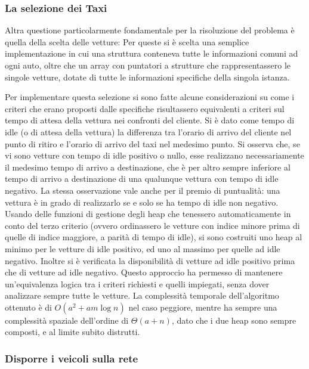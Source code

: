 \documentclass[a4paper,11pt]{Article}
\begin{document}
\subsubsection{La selezione dei Taxi}

Altra questione particolarmente fondamentale per la risoluzione del problema è quella della scelta delle vetture: Per queste si è scelta una semplice implementazione in cui una struttura conteneva tutte le informazioni comuni ad ogni auto, oltre che un array con puntatori a strutture che rappresentassero le singole vetture, dotate di tutte le informazioni specifiche della singola istanza.

Per implementare questa selezione si sono fatte alcune considerazioni su come i criteri che erano proposti dalle specifiche risultassero equivalenti a criteri sul tempo di attesa della vettura nei confronti del cliente.
Si è dato come tempo di idle (o di attesa della vettura) la differenza tra l'orario di arrivo del cliente nel punto di ritiro e l'orario di arrivo del taxi nel medesimo punto.
Si osserva che, se vi sono vetture con tempo di idle positivo o nullo, esse realizzano necessariamente il medesimo tempo di arrivo a destinazione, che è per altro sempre inferiore al tempo di arrivo a destinazione di una qualunque vettura con tempo di idle negativo. La stessa osservazione vale anche per il premio di puntualità: una vettura è in grado di realizzarlo se e solo se ha tempo di idle non negativo.
Usando delle funzioni di gestione degli heap che tenessero automaticamente in conto del terzo criterio (ovvero ordinassero le vetture con indice minore prima di quelle di indice maggiore, a parità di tempo di idle), si sono costruiti uno heap al minimo per le vetture di idle positivo, ed uno al massimo per quelle ad idle negativo.
Inoltre si è verificata la disponibilità di vetture ad idle positivo prima che di vetture ad idle negativo. Questo approccio ha permesso di mantenere un'equivalenza logica tra i criteri richiesti e quelli impiegati, senza dover analizzare sempre tutte le vetture. La complessità temporale dell'algoritmo ottenuto è di $O(a^2 + am\log{}n)$ nel caso peggiore, mentre ha sempre una complessità spaziale dell'ordine di $\Theta(a + n)$, dato che i due heap sono sempre composti, e al limite subito distrutti.

\subsubsection{Disporre i veicoli sulla rete}
\end{document}

